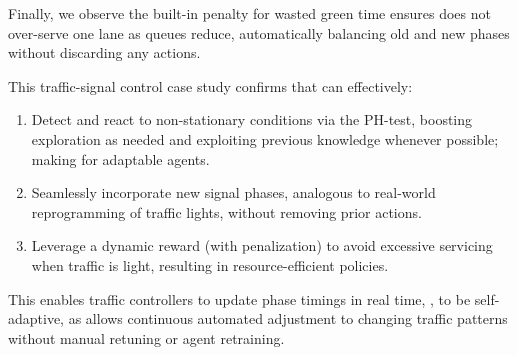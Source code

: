Finally, we observe the built-in penalty for wasted green time ensures \adaptiverl does not over-serve 
one lane as queues reduce, automatically balancing old and new phases without discarding any 
actions.

This traffic-signal control case study confirms that \adaptiverl can effectively:
\begin{enumerate}
  \item Detect and react to non-stationary conditions via the PH-test, boosting exploration as needed 
  and exploiting previous knowledge whenever possible; making for adaptable agents.
  \item Seamlessly incorporate new signal phases, analogous to real-world reprogramming of traffic 
  lights, without removing prior actions.
  \item Leverage a dynamic reward (with penalization) to avoid excessive servicing when traffic is light, 
  resulting in resource-efficient policies.
\end{enumerate}

This enables traffic controllers to update phase timings in real time, \ie, to be self-adaptive, 
 as \adaptiverl allows continuous automated adjustment to changing 
traffic patterns without manual retuning or agent retraining.


\endinput

